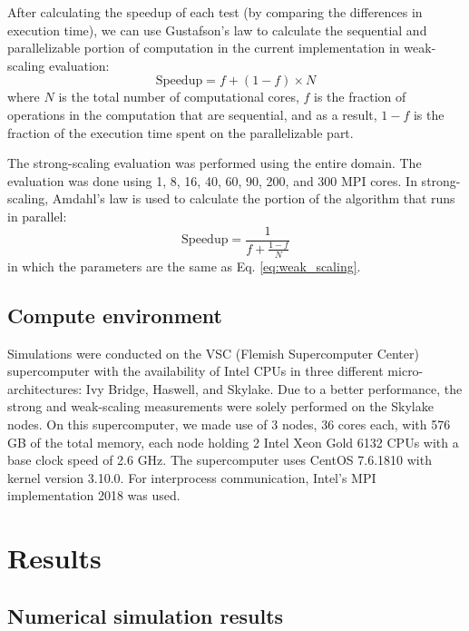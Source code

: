 After calculating the speedup of each test (by comparing the differences in execution time), we can use Gustafson’s law \cite{Gustafson1988} to calculate the sequential and parallelizable portion of computation in the current implementation in weak-scaling evaluation:
\begin{equation} \label{eq:weak_scaling}
\mathrm{Speedup} = f + (1-f) \times N
\end{equation}
where $N$ is the total number of computational cores, $f$ is the fraction of operations in the computation that are sequential, and as a result, $1-f$ is the fraction of the execution time spent on the parallelizable part.

The strong-scaling evaluation was performed using the entire domain. The evaluation was done using 1, 8, 16, 40, 60, 90, 200, and 300 \gls{MPI} cores. In strong-scaling, Amdahl’s law \cite{Amdahl1967} is used to calculate the portion of the algorithm that runs in parallel:
\begin{equation} \label{eq:strong_scaling}
\mathrm{Speedup} = \frac{1}{f + \frac{1-f}{N}}
\end{equation}
in which the parameters are the same as Eq. \ref{eq:weak_scaling}.


\subsection{Compute environment}

Simulations were conducted on the VSC (Flemish Supercomputer Center) supercomputer with the availability of Intel \gls{CPU}s in three different micro-architectures: Ivy Bridge, Haswell, and Skylake. Due to a better performance, the strong and weak-scaling measurements were solely performed on the Skylake nodes. On this supercomputer, we made use of 3 nodes, 36 cores each, with 576 GB of the total memory, each node holding 2 Intel Xeon Gold 6132 \gls{CPU}s with a base clock speed of 2.6 GHz. The supercomputer uses CentOS 7.6.1810 with kernel version 3.10.0. For interprocess communication, Intel's \gls{MPI} implementation 2018 was used.


\section{Results}

\subsection{Numerical simulation results}

